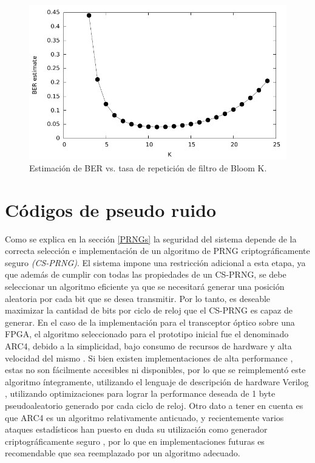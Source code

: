 \begin{figure}[!t]
  \centering
    \includegraphics[width=5in]{graphs/Kcalc}
    \caption{Estimación de BER vs. tasa de repetición de filtro de Bloom K.}
    \label{BERvsK}
\end{figure}

\section{Códigos de pseudo ruido}
Como se explica en la sección \ref{PRNGs} la seguridad del sistema depende de la correcta selección e implementación de un algoritmo de PRNG criptográficamente seguro \textit{(CS-PRNG)}.
El sistema impone una restricción adicional a esta etapa, ya que además de cumplir con todas las propiedades de un CS-PRNG, se debe seleccionar un algoritmo eficiente ya que se necesitará generar una posición aleatoria por cada bit que se desea transmitir. Por lo tanto, es deseable maximizar la cantidad de bits por ciclo de reloj que el CS-PRNG es capaz de generar.
En el caso de la implementación para el transceptor óptico sobre una FPGA, el algoritmo seleccionado para el prototipo inicial fue el denominado ARC4, debido a la simplicidad, bajo consumo de recursos de hardware y alta velocidad del mismo  \cite{Menezes:1996:HAC:548089}. Si bien existen implementaciones de alta performance \cite{10.1109/TC.2012.19}, estas no son fácilmente accesibles ni disponibles, por lo que se reimplementó este algoritmo íntegramente, utilizando el lenguaje de descripción de hardware Verilog \cite{thomas2002verilog}, utilizando optimizaciones para lograr la performance deseada de 1 byte pseudoaleatorio generado por cada ciclo de reloj. Otro dato a tener en cuenta es que ARC4 es un algoritmo relativamente anticuado, y recientemente varios ataques estadísticos han puesto en duda su utilización como generador criptográficamente seguro \cite{Sepehrdad:2011:SAR:2008684.2008712}, por lo que en implementaciones futuras es recomendable que sea reemplazado por un algoritmo adecuado.

